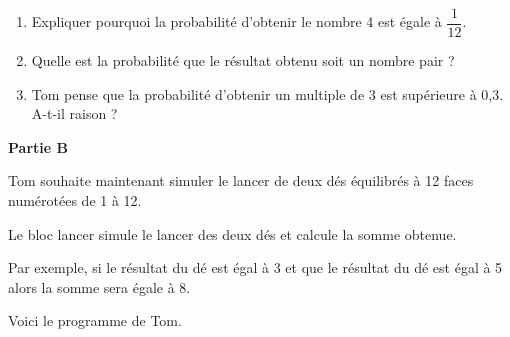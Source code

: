 \documentclass[exercice,a4]{thedocument}%
\begin{document}

\begin{enumerate}
\item Expliquer pourquoi la probabilité d'obtenir le nombre 4 est égale à $\dfrac{1}{12}$.
\item Quelle est la probabilité que le résultat obtenu soit un nombre pair ?
\item Tom pense que la probabilité d'obtenir un multiple de 3 est supérieure à 0,3. A-t-il raison ?
\end{enumerate}

\bigskip

\textbf{Partie B}

\medskip

Tom souhaite maintenant simuler le lancer de deux dés équilibrés à 12 faces numérotées de 1 à 12.

Le bloc \og lancer \fg{} simule le lancer des deux dés et calcule la somme obtenue.

Par exemple, si le résultat du dé  est égal à 3 et que le résultat du dé  est égal à 5 alors la somme sera égale à 8.

Voici le programme de Tom.
\end{document}
